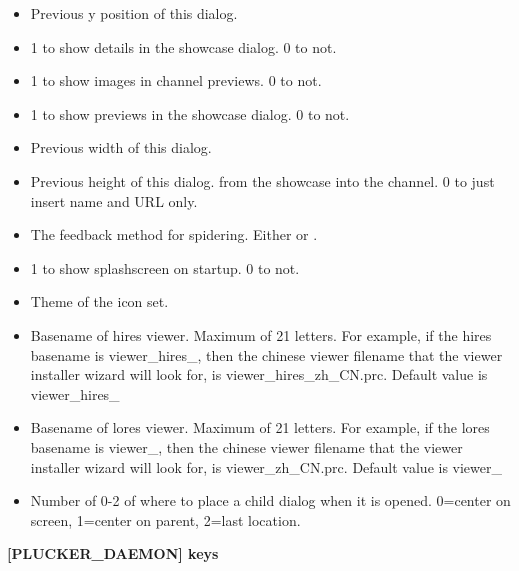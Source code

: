 \begin{helponly}
\begin{itemize}
  \item {} Previous y position of this dialog.
  \item {} 1 to show details in the showcase
    dialog. 0 to not.
  \item {} 1 to show images in channel
    previews. 0 to not.
  \item {} 1 to show previews in the showcase
    dialog. 0 to not.    
  \item {} Previous width of this dialog.
  \item {} Previous height of this dialog.
    from the showcase into the channel. 0 to just insert name and URL only.
  \item {} The feedback method for spidering. 
    Either  or .
  \item {} 1 to show splashscreen on startup. 0 to not.
  \item {} Theme of the icon set.
    \item {} Basename of hires viewer. Maximum of
    21 letters. For example, if the hires basename is viewer_hires_, then the 
	chinese viewer filename that the viewer installer wizard will look for, is
	viewer_hires_zh_CN.prc. Default value is viewer_hires_
  \item {} Basename of lores viewer. Maximum of
    21 letters. For example, if the lores basename is viewer_, then the 
	chinese viewer filename that the viewer installer wizard will look for, is
	viewer_zh_CN.prc. Default value is viewer_
  \item {} Number of 0-2 of where to place a child
    dialog when it is opened. 0=center on screen, 1=center on parent,
    2=last location.
\end{itemize}

\bf{[PLUCKER\_DAEMON] keys}


\end{helponly}
